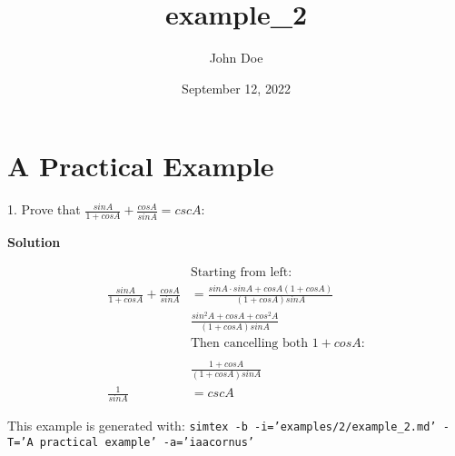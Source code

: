 \documentclass[12pt, UTF8]{article}
\title{example\_2}
\author{John Doe}
\date{September 12, 2022}
\begin{document}
	\maketitle
	
	\section*{A Practical Example}
	
	1. Prove that $\frac{sin A}{1 + cos A} + \frac{cos A}{sin A} = csc A$:
	
	\textbf{Solution}
	
	\begin{align}
		&\text{Starting from left:}  \nonumber \nonumber \\
		\frac{sin A}{1 + cos A} + \frac{cos A}{sin A} &= \frac{sin A \cdot sin A + cos A (1 + cos A)}{(1 + cos A) sin A} \\
		&\frac{sin^2 A + cos A + cos^2 A}{(1 + cos A) sin A} \\ 
		&\text{Then cancelling both $1 + cos A$:} \\ \nonumber \\
		&\frac{1 + cos A}{(1 + cos A) sin A} \\ 
		\frac{1}{sin A} &= csc A 
	\end{align}
	
	This example is generated with: \texttt{simtex -b -i='examples/2/example\_2.md'  -T='A practical example' -a='iaacornus'}
\end{document}
